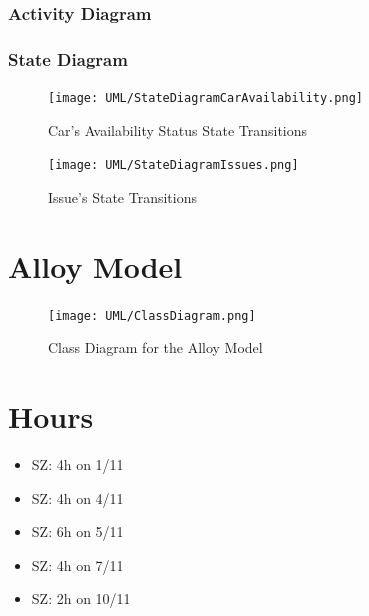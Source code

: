 \documentclass[11pt]{article} %
\begin{document}
\subsubsection{Activity Diagram}
\subsubsection{State Diagram}
\begin{figure}[H]
	\centering
	\texttt{[image: UML/StateDiagramCarAvailability.png]}
	\caption{Car's Availability Status State Transitions}
\end{figure}
\begin{figure}[H]
	\centering
	\texttt{[image: UML/StateDiagramIssues.png]}
	\caption{Issue's State Transitions}
\end{figure}



\newpage
\section{Alloy Model}



\begin{figure}[H]
	\centering
	\texttt{[image: UML/ClassDiagram.png]}
	\caption{Class Diagram for the Alloy Model}
\end{figure}

\newpage
\section{Hours}

\begin{itemize}
	\item SZ: 4h on 1/11
	\item SZ: 4h on 4/11
	\item SZ: 6h on 5/11
	\item SZ: 4h on 7/11
	\item SZ: 2h on 10/11
\end{itemize}
\end{document}
